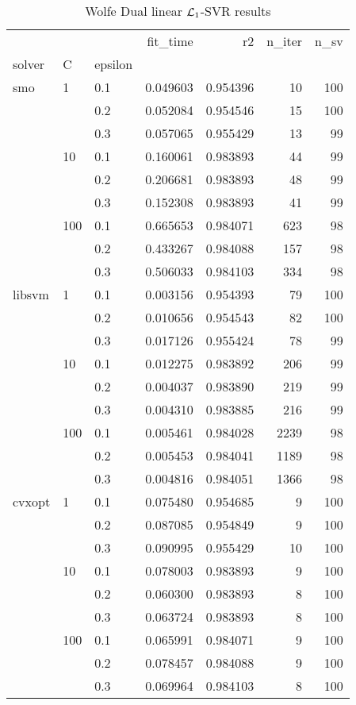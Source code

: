 \begin{table}[H]
\centering
\caption{Wolfe Dual linear $\protect \mathcal{L}_1$-SVR results}
\label{linear_dual_l1_svr_cv_results}
\begin{tabular}{lllrrrr}
\toprule
       &     &     &  fit\_time &        r2 &  n\_iter &  n\_sv \\
solver & C & epsilon &           &           &         &       \\
\midrule
smo & 1   & 0.1 &  0.049603 &  0.954396 &      10 &   100 \\
       &     & 0.2 &  0.052084 &  0.954546 &      15 &   100 \\
       &     & 0.3 &  0.057065 &  0.955429 &      13 &    99 \\
       & 10  & 0.1 &  0.160061 &  0.983893 &      44 &    99 \\
       &     & 0.2 &  0.206681 &  0.983893 &      48 &    99 \\
       &     & 0.3 &  0.152308 &  0.983893 &      41 &    99 \\
       & 100 & 0.1 &  0.665653 &  0.984071 &     623 &    98 \\
       &     & 0.2 &  0.433267 &  0.984088 &     157 &    98 \\
       &     & 0.3 &  0.506033 &  0.984103 &     334 &    98 \\
libsvm & 1   & 0.1 &  0.003156 &  0.954393 &      79 &   100 \\
       &     & 0.2 &  0.010656 &  0.954543 &      82 &   100 \\
       &     & 0.3 &  0.017126 &  0.955424 &      78 &    99 \\
       & 10  & 0.1 &  0.012275 &  0.983892 &     206 &    99 \\
       &     & 0.2 &  0.004037 &  0.983890 &     219 &    99 \\
       &     & 0.3 &  0.004310 &  0.983885 &     216 &    99 \\
       & 100 & 0.1 &  0.005461 &  0.984028 &    2239 &    98 \\
       &     & 0.2 &  0.005453 &  0.984041 &    1189 &    98 \\
       &     & 0.3 &  0.004816 &  0.984051 &    1366 &    98 \\
cvxopt & 1   & 0.1 &  0.075480 &  0.954685 &       9 &   100 \\
       &     & 0.2 &  0.087085 &  0.954849 &       9 &   100 \\
       &     & 0.3 &  0.090995 &  0.955429 &      10 &   100 \\
       & 10  & 0.1 &  0.078003 &  0.983893 &       9 &   100 \\
       &     & 0.2 &  0.060300 &  0.983893 &       8 &   100 \\
       &     & 0.3 &  0.063724 &  0.983893 &       8 &   100 \\
       & 100 & 0.1 &  0.065991 &  0.984071 &       9 &   100 \\
       &     & 0.2 &  0.078457 &  0.984088 &       9 &   100 \\
       &     & 0.3 &  0.069964 &  0.984103 &       8 &   100 \\
\bottomrule
\end{tabular}
\end{table}
